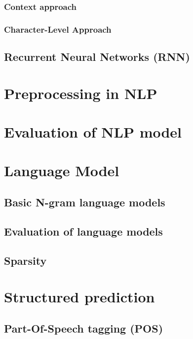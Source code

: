 			\subsubsection{Context approach}

			\subsubsection*{Character-Level Approach}

		\subsection{Recurrent Neural Networks (RNN)}

		\section{Preprocessing in NLP}

		\section{Evaluation of NLP model}


		\section{Language Model}

			\subsection{Basic N-gram language models}

			\subsection{Evaluation of language models}

			\subsection{Sparsity}

		\section{Structured prediction}

			\subsection{Part-Of-Speech tagging (POS)}

